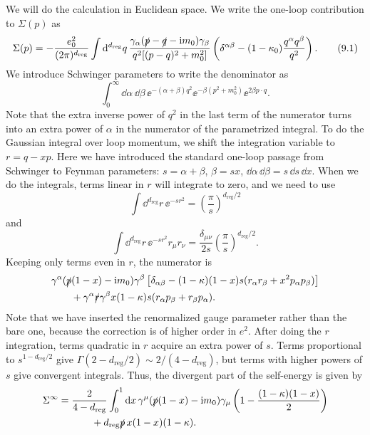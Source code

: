 We will do the calculation in Euclidean space. We write the one-loop
contribution to $\Sigma(p)$ as
\begin{equation}
  \Sigma(p)=-\frac{e_0^2}{(2\pi)^{d_{\mathrm{reg}}}}\int\mathop{}\!\mathrm{d}^{d_{\mathrm{reg}}}q\,
  \frac{\gamma_\alpha(\slashed p-\slashed q-\mathrm{i} m_0)\gamma_\beta}
  {q^2[(p-q)^2+m_0^2]}
  \left(\delta^{\alpha\beta}-(1-\kappa_0)\frac{q^\alpha q^\beta}{q^2}\right).
  \label{eq:9.1}
  \tag{9.1}
\end{equation}
We introduce Schwinger parameters to write the denominator as
\[
  \int_0^\infty\dd\alpha\,\dd\beta\,
  \ee^{-(\alpha+\beta)q^2}\ee^{-\beta(p^2+m_0^2)}
  \ee^{2\beta p\mathbin{\cdot}q}.
\]
Note that the extra inverse power of $q^2$ in the last term of the numerator
turns into an extra power of $\alpha$ in the numerator of the parametrized
integral. To do the Gaussian integral over loop momentum, we shift the
integration variable to $r=q-xp$. Here we have introduced the standard one-loop
passage from Schwinger to Feynman parameters: $s=\alpha+\beta$,
$\beta=sx$, $\dd\alpha\,\dd\beta=s\,\dd s\,\dd x$. When we do the integrals,
terms linear in $r$ will integrate to zero, and we need to use
\[
  \int\dd^{d_{\mathrm{reg}}}r\,\ee^{-sr^2}=\left(\frac{\pi}{s}\right)^{d_{\mathrm{reg}}/2}
\]
and
\[
  \int\dd^{d_{\mathrm{reg}}}r\,\ee^{-sr^2}r_\mu r_\nu
  =\frac{\delta_{\mu\nu}}{2s}\left(\frac{\pi}{s}\right)^{d_{\mathrm{reg}}/2}.
\]
Keeping only terms even in $r$, the numerator is
\[
\begin{aligned}
&\gamma^\alpha(\slashed p(1-x)-\mathrm{i} m_0)\gamma^\beta
 \left[\delta_{\alpha\beta}-(1-\kappa)(1-x)s
 (r_\alpha r_\beta+x^2p_\alpha p_\beta)\right]\\
&\qquad+\gamma^\alpha\slashed r\gamma^\beta x(1-\kappa)s
 (r_\alpha p_\beta+r_\beta p_\alpha).
\end{aligned}
\]
Note that we have inserted the renormalized gauge parameter rather than the
bare one, because the correction is of higher order in $e^2$. After doing the
$r$ integration, terms quadratic in $r$ acquire an extra power of $s$. Terms
proportional to $s^{1-d_{\mathrm{reg}}/2}$ give
$\Gamma(2-d_{\mathrm{reg}}/2)\sim2/(4-d_{\mathrm{reg}})$, but terms with
higher powers of $s$ give convergent integrals. Thus, the divergent part of the
self-energy is given by
\[
\begin{aligned}
  \Sigma^\infty={}&\frac{2}{4-d_{\mathrm{reg}}}\int_0^1\mathop{}\!\mathrm{d} x\,
  \gamma^\mu(\slashed p(1-x)-\mathrm{i} m_0)\gamma_\mu
  \left(1-\frac{(1-\kappa)(1-x)}{2}\right)\\
  &\qquad+d_{\mathrm{reg}}\slashed p\,x(1-x)(1-\kappa).
\end{aligned}
\]

